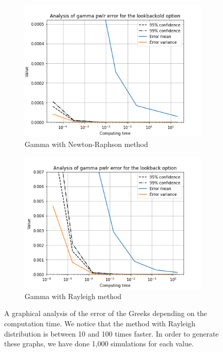 \documentclass[11pt,a4paper,fleqn]{article}
\begin{document}
\begin{figure}[h!]
       \begin{subfigure}[b]{0.45\textwidth}
           \includegraphics[width=\textwidth]{graphs/lookbackoldgammapwlrtime.png}
           \caption{Gamma with Newton-Raphson method}
       \end{subfigure}
       \begin{subfigure}[b]{0.45\textwidth}
           \includegraphics[width=\textwidth]{graphs/lookbackgammapwlrtime.png}
          \caption{Gamma with Rayleigh method}
      \end{subfigure}

        \caption{\label{fig:lboptiongraphs}A graphical analysis of the error of the Greeks depending on the computation time. We notice that the method with Rayleigh distribution is between 10 and 100 times faster. In order to generate these graphs, we have done 1,000 simulations for each value.}
 \end{figure}
 \FloatBarrier
\end{document}
